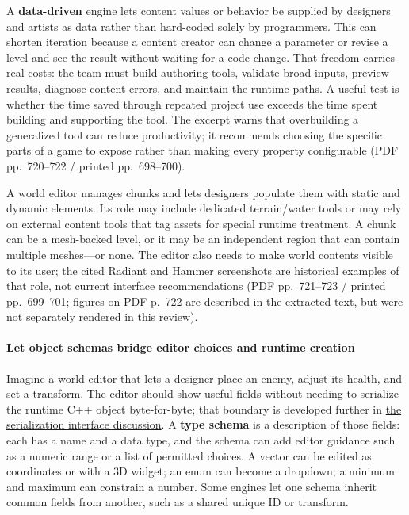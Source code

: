 A \textbf{data-driven} engine lets content values or behavior be supplied by designers and artists as data rather than hard-coded solely by programmers. This can shorten iteration because a content creator can change a parameter or revise a level and see the result without waiting for a code change. That freedom carries real costs: the team must build authoring tools, validate broad inputs, preview results, diagnose content errors, and maintain the runtime paths. A useful test is whether the time saved through repeated project use exceeds the time spent building and supporting the tool. The excerpt warns that overbuilding a generalized tool can reduce productivity; it recommends choosing the specific parts of a game to expose rather than making every property configurable (PDF pp.~720--722 / printed pp.~698--700).

A world editor manages chunks and lets designers populate them with static and dynamic elements. Its role may include dedicated terrain/water tools or may rely on external content tools that tag assets for special runtime treatment. A chunk can be a mesh-backed level, or it may be an independent region that can contain multiple meshes---or none. The editor also needs to make world contents visible to its user; the cited Radiant and Hammer screenshots are historical examples of that role, not current interface recommendations (PDF pp.~721--723 / printed pp.~699--701; figures on PDF p.~722 are described in the extracted text, but were not separately rendered in this review).

\paragraph{Let object schemas bridge editor choices and runtime creation}\label{06-engine-ii-ch032-let-object-schemas-bridge-editor-choices-and-runtime-creation}

Imagine a world editor that lets a designer place an enemy, adjust its health, and set a transform. The editor should show useful fields without needing to serialize the runtime C++ object byte-for-byte; that boundary is developed further in \hyperref[06-engine-ii-ch033-serialization-is-an-interface-between-tools-and-execution]{the serialization interface discussion}. A \textbf{type schema} is a description of those fields: each has a name and a data type, and the schema can add editor guidance such as a numeric range or a list of permitted choices. A vector can be edited as coordinates or with a 3D widget; an enum can become a dropdown; a minimum and maximum can constrain a number. Some engines let one schema inherit common fields from another, such as a shared unique ID or transform.

